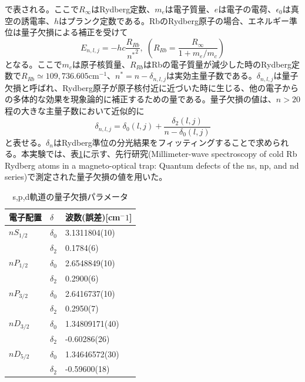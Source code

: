 \documentclass[dvipdfmx]{jsarticle}
\begin{document}
で表される。ここで$R_{\infty}$はRydberg定数、$m_e$は電子質量、$e$は電子の電荷、$\epsilon_0$は真空の誘電率、$h$はプランク定数である。RbのRydberg原子の場合、エネルギー準位は量子欠損による補正を受けて
\begin{equation}
 E_{n,l,j} = -hc\frac{R_{Rb}}{{n^*}^2},\; \left( R_{Rb} = \frac{R_{\infty}}{1 + m_e / m_c} \right)
\end{equation}
となる。ここで$m_c$は原子核質量、$R_{Rb}$はRbの電子質量が減少した時のRydberg定数で$R_{Rb} \simeq 109,736.605\text{cm}^{-1}$、${n^*} = n - \delta_{n,l,j}$は実効主量子数である。$\delta_{n,l,j}$は量子欠損と呼ばれ、Rydberg原子が原子核付近に近づいた時に生じる、他の電子からの多体的な効果を現象論的に補正するための量である。量子欠損の値は、$n > 20$程の大きな主量子数において近似的に
\begin{equation}
\delta_{n,l,j} = \delta_0(l,j) + \frac{\delta_2(l,j)}{n - \delta_0(l,j)}
\end{equation}
と表せる。$\delta_n$はRydberg準位の分光結果をフィッティングすることで求められる。本実験では、表\ref{table:qd}に示す、先行研究\cite{quantum-defect}(Millimeter-wave spectroscopy of cold Rb Rydberg atoms in a magneto-optical trap: Quantum defects of the ns, np, and nd series)で測定された量子欠損の値を用いた。
\begin{table}[hbtp]
  \caption{s,p,d軌道の量子欠損パラメータ}
  \label{table:qd}
  \centering
  \begin{tabular}{lll}
    \hline
    電子配置  & $\delta$ & 波数(誤差)[cm$^-1$] \\
    \hline
    \hline
    $nS_{1/2}$  & $\delta_0$ & 3.1311804(10) \\
                        & $\delta_2$ & 0.1784(6) \\
    $nP_{1/2}$  & $\delta_0$ & 2.6548849(10) \\
                        & $\delta_2$ & 0.2900(6) \\
    $nP_{3/2}$  & $\delta_0$ & 2.6416737(10) \\
                     & $\delta_2$ & 0.2950(7) \\
    $nD_{3/2}$  & $\delta_0$ & 1.34809171(40) \\
                        & $\delta_2$ & -0.60286(26) \\
    $nD_{5/2}$  & $\delta_0$ & 1.34646572(30) \\
                        & $\delta_2$ & -0.59600(18) \\
    \hline
  \end{tabular}
\end{table}
\end{document}
